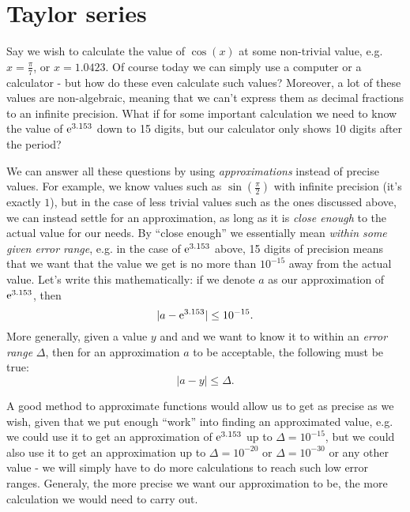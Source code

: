 \section{Taylor series}
Say we wish to calculate the value of $\cos(x)$ at some non-trivial value, e.g. $x=\frac{\pi}{7}$, or $x=1.0423$. Of course today we can simply use a computer or a calculator - but how do these even calculate such values? Moreover, a lot of these values are non-algebraic, meaning that we can't express them as decimal fractions to an infinite precision. What if for some important calculation we need to know the value of $\mathrm{e}^{3.153}$ down to 15 digits, but our calculator only shows 10 digits after the period?

We can answer all these questions by using \emph{approximations} instead of precise values. For example, we know values such as $\sin\left(\frac{\pi}{2}\right)$ with infinite precision (it's exactly $1$), but in the case of less trivial values such as the ones discussed above, we can instead settle for an approximation, as long as it is \textit{close enough} to the actual value for our needs. By ``close enough'' we essentially mean \textit{within some given error range}, e.g. in the case of $\mathrm{e}^{3.153}$ above, 15 digits of precision means that we want that the value we get is no more than $10^{-15}$ away from the actual value. Let's write this mathematically: if we denote $a$ as our approximation of $\mathrm{e}^{3.153}$, then
\[
  \lvert a-\mathrm{e}^{3.153}\rvert \leq 10^{-15}.
\]
More generally, given a value $y$ and and we want to know it to within an \emph{error range} $\Delta$, then for an approximation $a$ to be acceptable, the following must be true:
\begin{equation}
  \lvert a-y \rvert \leq \Delta.
  \label{eq:error_range}
\end{equation}

A good method to approximate functions would allow us to get as precise as we wish, given that we put enough ``work'' into finding an approximated value, e.g. we could use it to get an approximation of $\mathrm{e}^{3.153}$ up to $\Delta=10^{-15}$, but we could also use it to get an approximation up to $\Delta=10^{-20}$ or $\Delta=10^{-30}$ or any other value - we will simply have to do more calculations to reach such low error ranges. Generaly, the more precise we want our approximation to be, the more calculation we would need to carry out.

